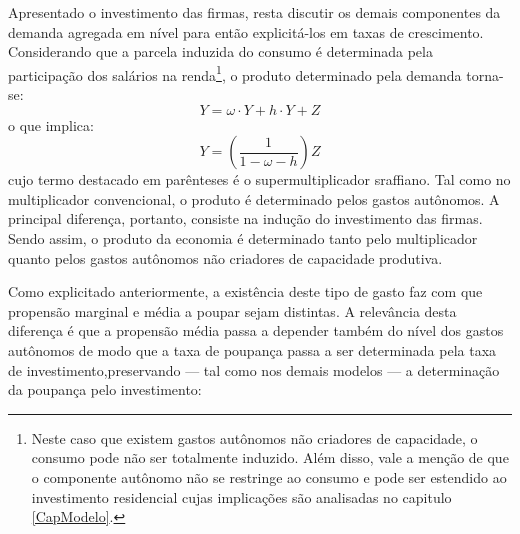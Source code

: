 Apresentado o investimento das firmas, resta discutir os demais componentes da demanda agregada em nível para então explicitá-los em taxas de crescimento.
Considerando que a parcela induzida do consumo é determinada pela participação dos salários  na renda\footnote{Neste caso que existem gastos autônomos não criadores de capacidade, o consumo pode não ser totalmente induzido. Além disso, vale a menção de que o componente autônomo não se restringe ao consumo e pode ser estendido ao investimento residencial cujas implicações são analisadas no capitulo \ref{CapModelo}.}, o produto determinado pela demanda torna-se:
\begin{equation}
\label{PIBSuper}
Y = \omega\cdot Y + h\cdot Y + Z
\end{equation}
o que implica:
\begin{equation}
\label{Supermultiplicador}
Y = \left(\frac{1}{1 - \omega - h}\right)Z
\end{equation}
cujo termo destacado em parênteses é o supermultiplicador sraffiano. Tal como no multiplicador convencional, o produto é determinado pelos gastos autônomos.
A principal diferença, portanto, consiste
na indução do investimento das firmas. 
Sendo assim, o produto da economia é determinado tanto pelo multiplicador quanto pelos gastos autônomos não criadores de capacidade produtiva.


Como explicitado anteriormente, a existência deste tipo de gasto faz com que propensão marginal e média a poupar sejam distintas. A relevância desta diferença é que a propensão média passa a depender também do nível dos gastos autônomos
de modo que a taxa de poupança passa a ser determinada pela taxa de investimento,preservando --- tal como nos demais modelos --- a determinação da poupança pelo investimento:


